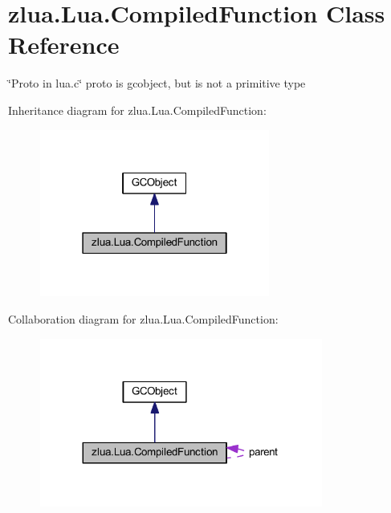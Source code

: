 \hypertarget{classzlua_1_1_lua_1_1_compiled_function}{}\section{zlua.\+Lua.\+Compiled\+Function Class Reference}
\label{classzlua_1_1_lua_1_1_compiled_function}


\char`\"{}\+Proto in lua.\+c\char`\"{} proto is gcobject, but is not a primitive type  




Inheritance diagram for zlua.\+Lua.\+Compiled\+Function\+:
\nopagebreak
\begin{figure}[H]
\begin{center}
\leavevmode
\includegraphics[width=214pt]{classzlua_1_1_lua_1_1_compiled_function__inherit__graph}
\end{center}
\end{figure}


Collaboration diagram for zlua.\+Lua.\+Compiled\+Function\+:
\nopagebreak
\begin{figure}[H]
\begin{center}
\leavevmode
\includegraphics[width=263pt]{classzlua_1_1_lua_1_1_compiled_function__coll__graph}
\end{center}
\end{figure}
